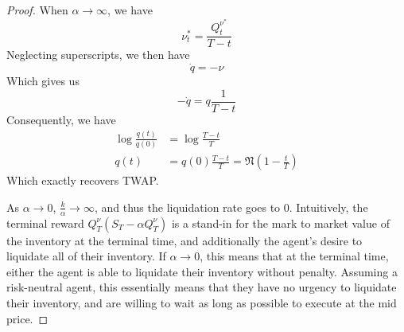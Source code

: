\documentclass{amsart}
\begin{document}
\begin{proof}
    When $\alpha \to \infty$, we have 
    \[
    \nu_t^\ast = \frac{Q_t^{\nu^\ast}}{T - t}
    \]
    Neglecting superscripts, we then have 
    \[
    \dot{q} = - \nu
    \]
    Which gives us 
    \[
    -\dot{q} = q \frac{1}{T - t}
    \]
    Consequently, we have 
    \begin{align*}
        \log \frac{q(t)}{q(0)} &= \log \frac{T - t}{T} \\
        q(t) &= q(0) \frac{T - t}{T}  = \mathfrak{N} \left(1 - \frac{t}{T}\right)
    \end{align*}
    Which exactly recovers TWAP.

    As $\alpha \to 0$, $\frac{k}{\alpha} \to \infty$, and thus the liquidation rate goes to $0$. 
    Intuitively, the terminal reward $Q^\nu_T(S_T - \alpha Q_T^\nu)$ is a stand-in for the mark to market value of the inventory at the terminal time, 
    and additionally the agent's desire to liquidate all of their inventory. 
    If $\alpha \to 0$, this means that at the terminal time, either the agent is able to liquidate their inventory without penalty.
    Assuming a risk-neutral agent, this essentially means that they have no urgency to liquidate their inventory, 
    and are willing to wait as long as possible to execute at the mid price. 
\end{proof}
\end{document}

